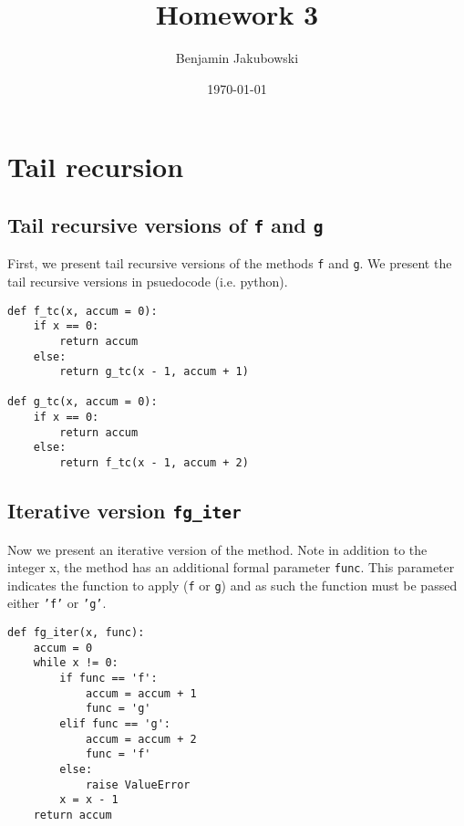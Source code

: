 \documentclass[paper=a4, fontsize=11pt]{scrartcl} %
\title{	Homework 3}
\author{Benjamin Jakubowski} %
\date{\normalsize\today} %
\numberwithin{equation}{section} %
\numberwithin{figure}{section} %
\numberwithin{table}{section} %
\begin{document}
\maketitle %


\section{Tail recursion}

\subsection{Tail recursive versions of \texttt{f} and \texttt{g}}

First, we present tail recursive versions of the methods \texttt{f} and \texttt{g}. We present the tail recursive versions in psuedocode (i.e. python).
 
\begin{lstlisting}
def f_tc(x, accum = 0):
    if x == 0:
        return accum
    else:
        return g_tc(x - 1, accum + 1)

def g_tc(x, accum = 0):
    if x == 0:
        return accum
    else:
        return f_tc(x - 1, accum + 2)
\end{lstlisting}

\subsection{Iterative version \texttt{fg\_iter}}

Now we present an iterative version of the method. Note in addition to the integer x, the method has an additional formal parameter \texttt{func}. This parameter indicates the function to apply (\texttt{f} or \texttt{g}) and as such the function must be passed either \texttt{'f'} or \texttt{'g'}.
\begin{lstlisting}
def fg_iter(x, func):
    accum = 0
    while x != 0:
        if func == 'f':
            accum = accum + 1
            func = 'g'
        elif func == 'g':
            accum = accum + 2
            func = 'f'
        else:
            raise ValueError
        x = x - 1
    return accum
\end{lstlisting}
\end{document}
